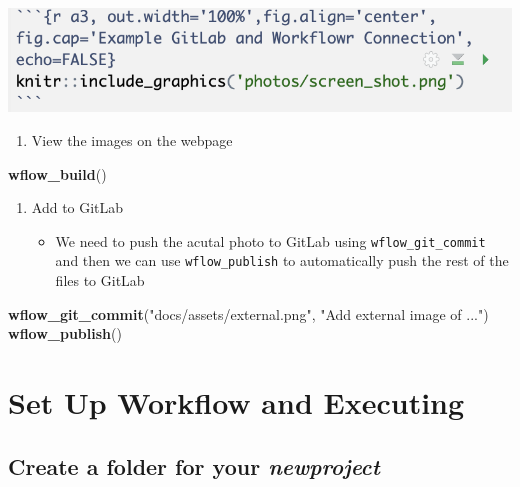 \documentclass[]{book}
\newenvironment{Shaded}{\begin{snugshade}}{\end{snugshade}}
\newcommand{\KeywordTok}[1]{\textcolor[rgb]{0.13,0.29,0.53}{\textbf{#1}}}
\newcommand{\NormalTok}[1]{#1}
\newcommand{\StringTok}[1]{\textcolor[rgb]{0.31,0.60,0.02}{#1}}
\providecommand{\tightlist}{%
  \setlength{\itemsep}{0pt}\setlength{\parskip}{0pt}}
\begin{document}
\begin{flushleft}\includegraphics[width=0.5\linewidth]{images/Workflow_Photos/photoExample} \end{flushleft}

\begin{enumerate}
\def\labelenumi{\arabic{enumi}.}
\setcounter{enumi}{2}
\tightlist
\item
  View the images on the webpage
\end{enumerate}

\begin{Shaded}
\begin{Highlighting}[]
\KeywordTok{wflow_build}\NormalTok{()}
\end{Highlighting}
\end{Shaded}

\begin{enumerate}
\def\labelenumi{\arabic{enumi}.}
\setcounter{enumi}{3}
\tightlist
\item
  Add to GitLab

  \begin{itemize}
  \tightlist
  \item
    We need to push the acutal photo to GitLab using \texttt{wflow\_git\_commit} and then we can use \texttt{wflow\_publish} to automatically push the rest of the files to GitLab
  \end{itemize}
\end{enumerate}

\begin{Shaded}
\begin{Highlighting}[]
\KeywordTok{wflow_git_commit}\NormalTok{(}\StringTok{"docs/assets/external.png"}\NormalTok{, }\StringTok{"Add external image of ..."}\NormalTok{)}
\KeywordTok{wflow_publish}\NormalTok{()}
\end{Highlighting}
\end{Shaded}

\hypertarget{set-up-workflow-and-executing}{%
\section{Set Up Workflow and Executing}\label{set-up-workflow-and-executing}}

\hypertarget{create-a-folder-for-your-newproject}{%
\subsection{\texorpdfstring{Create a folder for your \emph{newproject}}{Create a folder for your newproject}}\label{create-a-folder-for-your-newproject}}
\end{document}
